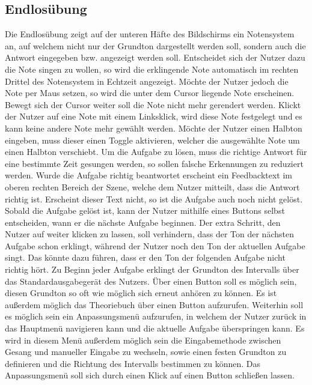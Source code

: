 \subsection{Endlosübung}
Die Endlosübung zeigt auf der unteren Häfte des Bildschirms ein Notensystem an, auf welchem nicht nur der Grundton dargestellt werden soll, sondern auch die Antwort eingegeben bzw. angezeigt werden soll. Entscheidet sich der Nutzer dazu die Note singen zu wollen, so wird die erklingende Note automatisch im rechten Drittel des Notensystem in Echtzeit angezeigt. Möchte der Nutzer jedoch die Note per Maus setzen, so wird die unter dem Cursor liegende Note erscheinen. Bewegt sich der Cursor weiter soll die Note nicht mehr gerendert werden. Klickt der Nutzer auf eine Note mit einem Linksklick, wird diese Note festgelegt und es kann keine andere Note mehr gewählt werden. Möchte der Nutzer einen Halbton eingeben, muss dieser einen Toggle aktivieren, welcher die ausgewählte Note um einen Halbton verschiebt. Um die Aufgabe zu lösen, muss die richtige Antwort für eine bestimmte Zeit gesungen werden, so sollen falsche Erkennungen zu reduziert werden. Wurde die Aufgabe richtig beantwortet erscheint ein Feedbacktext im oberen rechten Bereich der Szene, welche dem Nutzer mitteilt, dass die Antwort richtig ist. Erscheint dieser Text nicht, so ist die Aufgabe auch noch nicht gelöst. Sobald die Aufgabe gelöst ist, kann der Nutzer mithilfe eines Buttons selbst entscheiden, wann er die nächste Aufgabe beginnen. Der extra Schritt, den Nutzer auf weiter klicken zu lassen, soll verhindern, dass der Ton der nächsten Aufgabe schon erklingt, während der Nutzer noch den Ton der aktuellen Aufgabe singt. Das könnte dazu führen, dass er den Ton der folgenden Aufgabe nicht richtig hört. Zu Beginn jeder Aufgabe erklingt der Grundton des Intervalls über das Standardausgabegerät des Nutzers. Über einen Button soll es möglich sein, diesen Grundton so oft wie möglich sich erneut anhören zu können. Es ist außerdem möglich das Theoriebuch über einen Button aufzurufen. Weiterhin soll es möglich sein ein Anpassungsmenü aufzurufen, in welchem der Nutzer zurück in das Hauptmenü navigieren kann und die aktuelle Aufgabe überspringen kann. Es wird in diesem Menü außerdem möglich sein die Eingabemethode zwischen Gesang und manueller Eingabe zu wechseln, sowie einen festen Grundton zu definieren und die Richtung des Intervalls bestimmen zu können. Das Anpassungsmenü soll sich durch einen Klick auf einen Button schließen lassen. 

